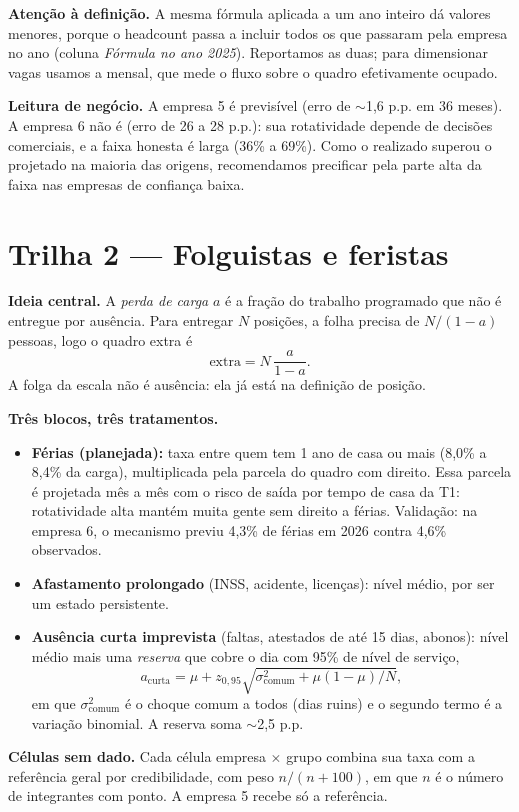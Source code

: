 \documentclass[11pt,a4paper]{article}
\begin{document}
\textbf{Atenção à definição.} A mesma fórmula aplicada a um ano inteiro dá valores menores, porque o headcount passa a incluir todos os que passaram pela empresa no ano (coluna \emph{Fórmula no ano 2025}). Reportamos as duas; para dimensionar vagas usamos a mensal, que mede o fluxo sobre o quadro efetivamente ocupado.

\textbf{Leitura de negócio.} A empresa 5 é previsível (erro de $\sim$1,6 p.p. em 36 meses). A empresa 6 não é (erro de 26 a 28 p.p.): sua rotatividade depende de decisões comerciais, e a faixa honesta é larga (36\% a 69\%). Como o realizado superou o projetado na maioria das origens, recomendamos precificar pela parte alta da faixa nas empresas de confiança baixa.

\section{Trilha 2 --- Folguistas e feristas}\label{sec:t2}
\textbf{Ideia central.} A \emph{perda de carga} $a$ é a fração do trabalho programado que não é entregue por ausência. Para entregar $N$ posições, a folha precisa de $N/(1-a)$ pessoas, logo o quadro extra é
\[ \text{extra} = N\,\frac{a}{1-a}. \]
A folga da escala não é ausência: ela já está na definição de posição.

\textbf{Três blocos, três tratamentos.}
\begin{itemize}
\item \textbf{Férias (planejada):} taxa entre quem tem 1 ano de casa ou mais (8,0\% a 8,4\% da carga), multiplicada pela parcela do quadro com direito. Essa parcela é projetada mês a mês com o risco de saída por tempo de casa da T1: rotatividade alta mantém muita gente sem direito a férias. Validação: na empresa 6, o mecanismo previu 4,3\% de férias em 2026 contra 4,6\% observados.
\item \textbf{Afastamento prolongado} (INSS, acidente, licenças): nível médio, por ser um estado persistente.
\item \textbf{Ausência curta imprevista} (faltas, atestados de até 15 dias, abonos): nível médio mais uma \emph{reserva} que cobre o dia com 95\% de nível de serviço,
\[ a_{\text{curta}} = \mu + z_{0,95}\sqrt{\sigma^2_{\text{comum}} + \mu(1-\mu)/N}, \]
em que $\sigma^2_{\text{comum}}$ é o choque comum a todos (dias ruins) e o segundo termo é a variação binomial. A reserva soma $\sim$2,5 p.p.
\end{itemize}

\textbf{Células sem dado.} Cada célula empresa $\times$ grupo combina sua taxa com a referência geral por credibilidade, com peso $n/(n+100)$, em que $n$ é o número de integrantes com ponto. A empresa 5 recebe só a referência.
\end{document}
